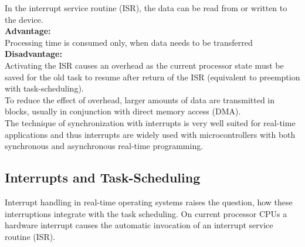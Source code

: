 In the interrupt service routine (ISR), the data can be read from or written to the device.\\

\textbf{Advantage: }\\Processing time is consumed only, when data needs to be transferred\\

\textbf{Disadvantage: }\\Activating the ISR causes an overhead as the current processor state must be    saved for the old task to resume after return of the ISR    (equivalent to preemption with task-scheduling).\\

To reduce the effect of overhead, larger amounts of data are transmitted in blocks, usually in conjunction with direct memory access (DMA).\\

The technique of synchronization with interrupts is very well suited for real-time applications and thus interrupts are widely used with microcontrollers with both synchronous and asynchronous real-time programming.

\subsection{Interrupts and Task-Scheduling}

Interrupt handling in real-time operating systems raises the question, how these interruptions integrate with the task scheduling. On current processor CPUs a hardware interrupt causes the automatic invocation of an interrupt service routine (ISR). \\

